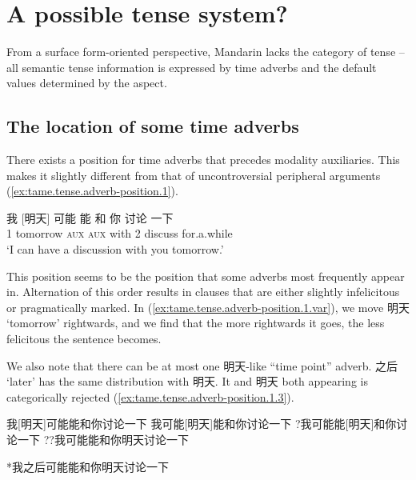 \documentclass[UTF8, a4paper, oneside, scheme=plain, 12pt]{ctexrep}
\newcommand{\translate}[1]{`#1'}
\newcommand*{\category}[1]{\textsc{#1}}
\begin{document}
\section{A possible tense system?}\label{sec:tam.tense}

From a surface form-oriented perspective, 
Mandarin lacks the category of tense -- 
all semantic tense information is 
expressed by time adverbs 
and the default values determined by the aspect.

\subsection{The location of some time adverbs}

There exists a position for time adverbs that precedes modality auxiliaries.
This makes it slightly different from that 
of uncontroversial peripheral arguments
(\ref{ex:tame.tense.adverb-position.1}).

\begin{exe}
    \ex\label{ex:tame.tense.adverb-position.1}
    \gll 我 [明天] 可能 能 和 你 讨论 一下 \\
    1 tomorrow \category{aux} \category{aux} with 2 discuss for.a.while \\
    \glt\translate{I can have a discussion with you tomorrow.}
\end{exe}

This position seems to be the position that some adverbs most frequently appear in.
Alternation of this order results in 
clauses that are either slightly infelicitous 
or pragmatically marked. 
In (\ref{ex:tame.tense.adverb-position.1.var}),
we move 明天 \translate{tomorrow} rightwards,
and we find that the more rightwards it goes,
the less felicitous the sentence becomes.

We also note that there can be at most one 明天-like ``time point'' adverb.
之后 \translate{later} has the same distribution with 明天.
It and 明天 both appearing is categorically rejected 
(\ref{ex:tame.tense.adverb-position.1.3}).

\begin{exe}
    \ex\label{ex:tame.tense.adverb-position.1.var} \begin{xlist}
        \ex 我[明天]可能能和你讨论一下
        \ex 我可能[明天]能和你讨论一下
        \ex ?我可能能[明天]和你讨论一下
        \ex ??我可能能和你明天讨论一下
    \end{xlist}

    \ex\label{ex:tame.tense.adverb-position.1.3} *我之后可能能和你明天讨论一下
\end{exe}
\end{document}
